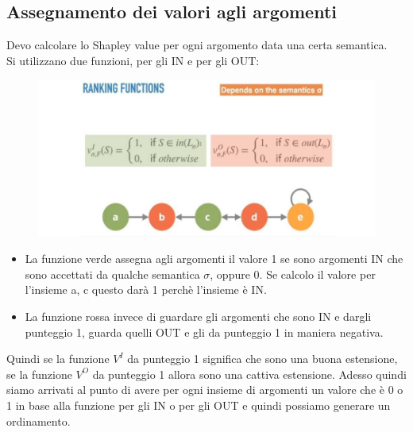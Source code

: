 \subsection{Assegnamento dei valori agli argomenti}
Devo calcolare lo Shapley value per ogni argomento data una certa semantica.
\\
Si utilizzano due funzioni, per gli IN e per gli OUT:
\begin{figure}[htp]
	\centering
    \includegraphics[width=13cm, keepaspectratio]{img/Cap8/ordinamento-quantitativo.png}
\end{figure}
\newpage
\begin{itemize}
    \item La funzione verde assegna agli argomenti il valore 1 se sono argomenti IN che sono accettati da qualche semantica $\sigma$, oppure 0. Se calcolo il valore per l’insieme a, c questo darà 1 perchè l’insieme è IN.
    \item La funzione rossa invece di guardare gli argomenti che sono IN e dargli punteggio 1, guarda quelli OUT e gli da punteggio 1 in maniera negativa.
\end{itemize}
Quindi se la funzione $V^I$ da punteggio 1 significa che sono una buona estensione, se la funzione $V^O$ da punteggio 1 allora sono una cattiva estensione. Adesso quindi siamo arrivati al punto di avere per ogni insieme di argomenti un valore che è 0 o 1 in base alla funzione per gli IN o per gli OUT e quindi possiamo generare un ordinamento.
